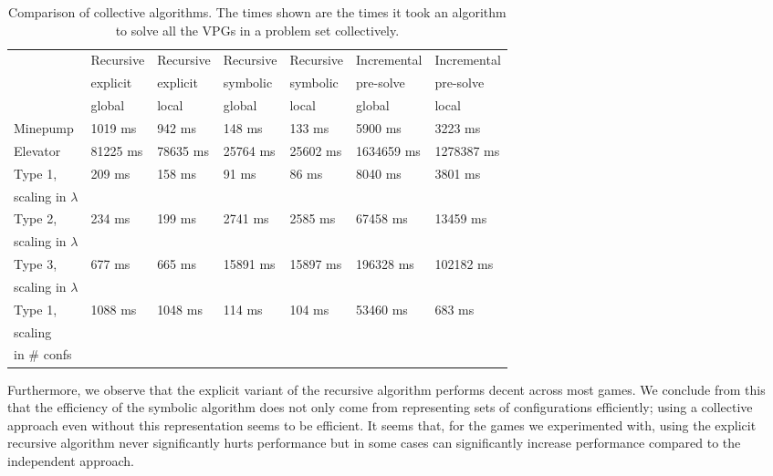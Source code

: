\begin{table}[h]
	\centering
	\begin{tabular}{|l|l|l|l|l|l|l|}
		\hline
		& Recursive&Recursive &Recursive &Recursive & Incremental& Incremental\\
		& explicit &explicit & symbolic &symbolic & pre-solve &pre-solve\\
		& global & local &global  & local & global & local
		\\ \hline
		Minepump& 1019 ms& 942 ms& 148 ms& 133 ms& 5900 ms& 3223 ms\\ \hline
		Elevator& 81225 ms& 78635 ms& 25764 ms& 25602 ms& 1634659 ms& 1278387 ms\\ \hline
		Type 1, & \multirow{2}{*}{209 ms}& \multirow{2}{*}{158 ms} & \multirow{2}{*}{91 ms} & \multirow{2}{*}{86 ms} & \multirow{2}{*}{8040 ms} & \multirow{2}{*}{3801 ms}\\
		scaling in $\lambda$& & & & & &\\ \hline
		Type 2,& \multirow{2}{*}{234 ms} & \multirow{2}{*}{199 ms} & \multirow{2}{*}{2741 ms} & \multirow{2}{*}{2585 ms} & \multirow{2}{*}{67458 ms} & \multirow{2}{*}{13459 ms} \\
		scaling in $\lambda$& & & & & &\\ \hline
		Type 3,& \multirow{2}{*}{677 ms} & \multirow{2}{*}{665 ms} & \multirow{2}{*}{15891 ms} & \multirow{2}{*}{15897 ms} & \multirow{2}{*}{196328 ms} & \multirow{2}{*}{102182 ms}\\ 
		scaling in $\lambda$& & & & & &\\ \hline
		Type 1,& \multirow{3}{*}{1088 ms} & \multirow{3}{*}{1048 ms} & \multirow{3}{*}{114 ms} & \multirow{3}{*}{104 ms} & \multirow{3}{*}{53460 ms} & \multirow{3}{*}{683 ms} \\
		scaling& & & & & &\\
		in \# confs& & & & & &\\ \hline
	\end{tabular}
	\caption{Comparison of collective algorithms. The times shown are the times it took an algorithm to solve all the VPGs in a problem set collectively.}
	\label{tab_compare_collective_algs}
\end{table}

Furthermore, we observe that the explicit variant of the recursive algorithm performs decent across most games. We conclude from this that the efficiency of the symbolic algorithm does not only come from representing sets of configurations efficiently; using a collective approach even without this representation seems to be efficient. It seems that, for the games we experimented with, using the explicit recursive algorithm never significantly hurts performance but in some cases can significantly increase performance compared to the independent approach.

